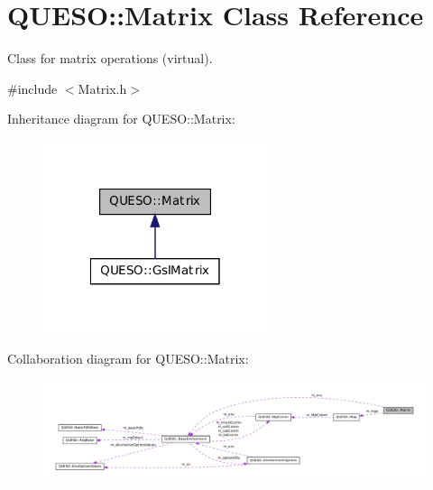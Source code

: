 \hypertarget{class_q_u_e_s_o_1_1_matrix}{\section{Q\-U\-E\-S\-O\-:\-:Matrix Class Reference}
\label{class_q_u_e_s_o_1_1_matrix}
}


Class for matrix operations (virtual).  




{\ttfamily \#include $<$Matrix.\-h$>$}



Inheritance diagram for Q\-U\-E\-S\-O\-:\-:Matrix\-:
\nopagebreak
\begin{figure}[H]
\begin{center}
\leavevmode
\includegraphics[width=186pt]{class_q_u_e_s_o_1_1_matrix__inherit__graph}
\end{center}
\end{figure}


Collaboration diagram for Q\-U\-E\-S\-O\-:\-:Matrix\-:
\nopagebreak
\begin{figure}[H]
\begin{center}
\leavevmode
\includegraphics[width=350pt]{class_q_u_e_s_o_1_1_matrix__coll__graph}
\end{center}
\end{figure}
